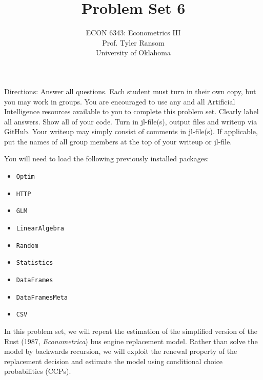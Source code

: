 \documentclass[12pt,english]{article}
\begin{document}
\title{Problem Set 6}
\author{ECON 6343: Econometrics III\\
Prof. Tyler Ransom\\
University of Oklahoma}
\date{}%

\maketitle
Directions: Answer all questions. Each student must turn in their own copy, but you may work in groups. You are encouraged to use any and all Artificial Intelligence resources available to you to complete this problem set. Clearly label all answers. Show all of your code. Turn in jl-file(s), output files and writeup via GitHub. Your writeup may simply consist of comments in jl-file(s). If applicable, put the names of all group members at the top of your writeup or jl-file.


You will need to load the following previously installed packages:
\begin{itemize}
    \item[~] \texttt{Optim} 
    \item[~] \texttt{HTTP} 
    \item[~] \texttt{GLM} 
    \item[~] \texttt{LinearAlgebra} 
    \item[~] \texttt{Random} 
    \item[~] \texttt{Statistics} 
    \item[~] \texttt{DataFrames} 
    \item[~] \texttt{DataFramesMeta} 
    \item[~] \texttt{CSV} 
\end{itemize}
\pagebreak
In this problem set, we will repeat the estimation of the simplified version of the Rust (1987, \textit{Econometrica}) bus engine replacement model. Rather than solve the model by backwards recursion, we will exploit the renewal property of the replacement decision and estimate the model using conditional choice probabilities (CCPs). 
\end{document}
